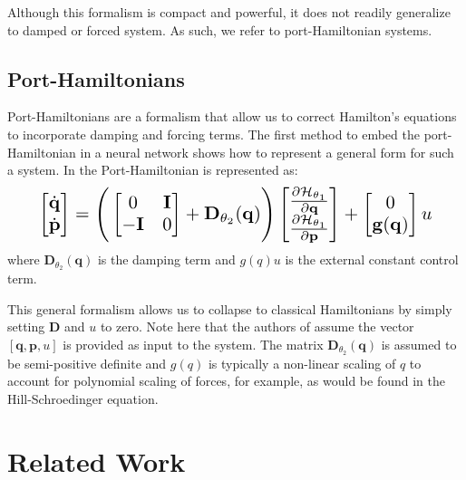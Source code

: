 \documentclass[twoside]{article}
\begin{document}
Although this formalism is compact and powerful, it does not readily generalize to damped or forced system. As such, we refer to port-Hamiltonian systems.

\subsection{Port-Hamiltonians}

Port-Hamiltonians are a formalism that allow us to correct Hamilton's equations to incorporate damping and forcing terms. The first method to embed the port-Hamiltonian in a neural network \cite{zhong_dissipative_2020} shows how to represent a general form for such a system. In \cite{zhong_dissipative_2020} the Port-Hamiltonian is represented as:
\begin{equation}
\resizebox{0.9\linewidth}{!}{$%
\begin{bmatrix}
\dot{\mathbf{q}} \\
\dot{\mathbf{p}}
\end{bmatrix}
=
\Bigg(\begin{bmatrix}
0 & \mathbf{I} \\
-\mathbf{I} & 0
\end{bmatrix} +
\mathbf{D}_{\theta_2}(\mathbf{q})
 \Bigg)
 \begin{bmatrix}
\frac{\partial \mathcal{H}_{\theta_1}}{\partial \mathbf{q}} \\
\frac{\partial \mathcal{H}_{\theta_1}}{\partial \mathbf{p}}
\end{bmatrix}
+
\begin{bmatrix}
0 \\
\mathbf{g}(\mathbf{q})
\end{bmatrix}
u
$%
}%
\label{eqn.pham}
\end{equation}
where $\mathbf{D}_{\theta_2}(\mathbf{q})$ is the damping term and $g(q)u$ is the external constant control term. 

This general formalism allows us to collapse to classical Hamiltonians by simply setting $\mathbf{D}$ and $u$ to zero. Note here that the authors of \cite{zhong_dissipative_2020} assume the vector $[\mathbf{q},\mathbf{p},u]$ is provided as input to the system. The matrix $\mathbf{D}_{\theta_2}(\mathbf{q})$ is assumed to be semi-positive definite and $g(q)$ is typically a non-linear scaling of $q$ to account for polynomial scaling of forces, for example, as would be found in the Hill-Schroedinger equation.

\section{Related Work}
\end{document}
